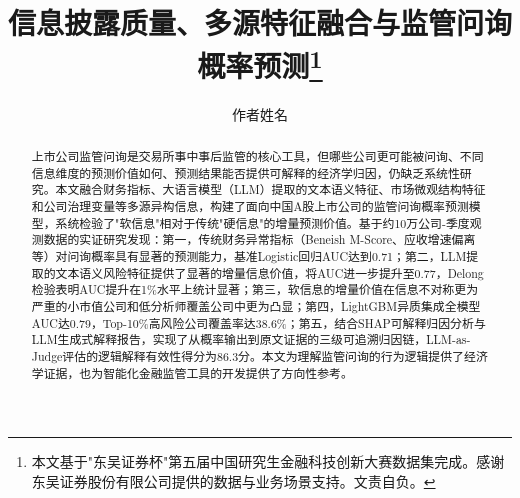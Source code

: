 \documentclass{chinese-erj}
\title{信息披露质量、多源特征融合与监管问询概率预测\thanks{本文基于"东吴证券杯"第五届中国研究生金融科技创新大赛数据集完成。感谢东吴证券股份有限公司提供的数据与业务场景支持。文责自负。}}
\author{作者姓名}
\date{}
\begin{document}
\maketitle

\begin{abstract}
上市公司监管问询是交易所事中事后监管的核心工具，但哪些公司更可能被问询、不同信息维度的预测价值如何、预测结果能否提供可解释的经济学归因，仍缺乏系统性研究。本文融合财务指标、大语言模型（LLM）提取的文本语义特征、市场微观结构特征和公司治理变量等多源异构信息，构建了面向中国A股上市公司的监管问询概率预测模型，系统检验了"软信息"相对于传统"硬信息"的增量预测价值。基于约10万公司-季度观测数据的实证研究发现：第一，传统财务异常指标（Beneish M-Score、应收增速偏离等）对问询概率具有显著的预测能力，基准Logistic回归AUC达到0.71；第二，LLM提取的文本语义风险特征提供了显著的增量信息价值，将AUC进一步提升至0.77，Delong检验表明AUC提升在1\%水平上统计显著；第三，软信息的增量价值在信息不对称更为严重的小市值公司和低分析师覆盖公司中更为凸显；第四，LightGBM异质集成全模型AUC达0.79，Top-10\%高风险公司覆盖率达38.6\%；第五，结合SHAP可解释归因分析与LLM生成式解释报告，实现了从概率输出到原文证据的三级可追溯归因链，LLM-as-Judge评估的逻辑解释有效性得分为86.3分。本文为理解监管问询的行为逻辑提供了经济学证据，也为智能化金融监管工具的开发提供了方向性参考。
\end{abstract}














\erjref
\printbibliography[heading=none]


\enmaketitle
\end{document}
